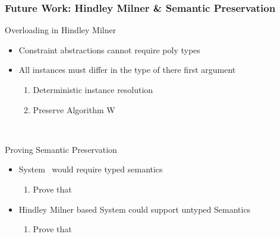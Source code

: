 \documentclass{beamer}
\begin{document}
\begin{frame}[fragile]
  \frametitle{Future Work: Hindley Milner \& Semantic Preservation}
  \begin{block}{Overloading in Hindley Milner}
    \
    \begin{itemize}
      \item Constraint abstractions cannot require poly types
      \item All instances must differ in the type of there first argument
	    \begin{enumerate}
        \item Deterministic instance resolution
        \item Preserve Algorithm W
      \end{enumerate}
    \end{itemize}
    \
  \end{block}
  \begin{block}{Proving Semantic Preservation}
    \
    \begin{itemize}
      \item System \Fo\ would require typed semantics
      \begin{enumerate}
        \item Prove that 
      \end{enumerate}
      \item Hindley Milner based System could support untyped Semantics
      \begin{enumerate}
        \item Prove that 
      \end{enumerate}
    \end{itemize}
    \
  \end{block}
\end{frame}
\end{document}
